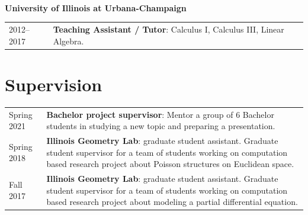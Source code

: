 \documentclass[margin,line,pifont,palatino,courier]{res}
\newenvironment{list1}{
  \begin{list}{\ding{113}}{%
      \setlength{\itemsep}{0in}
      \setlength{\parsep}{0in} \setlength{\parskip}{0in}
      \setlength{\topsep}{0in} \setlength{\partopsep}{0in}
      \setlength{\leftmargin}{0.17in}}}{\end{list}}
\begin{document}
\begin{resume}
\begin{tabular}{@{}p{1.2in}p{0.5in}p{3in}}
\end{tabular}\\
\begin{list1}
\item[] \textbf{University of Illinois at Urbana-Champaign}
\end{list1}
\begin{tabular}{@{}p{1.2in}p{3.5in}}
2012--2017 & \textbf{Teaching Assistant / Tutor}: Calculus I, Calculus III, Linear Algebra.
\end{tabular}
\newpage

\section{\sc Supervision}
\begin{tabular}{@{}p{1.2in}p{3in}}
Spring 2021 &  \textbf{Bachelor project supervisor}: Mentor a group of 6 Bachelor students in studying a new topic and preparing a presentation.\\
Spring 2018 & \textbf{Illinois Geometry Lab}: graduate student assistant. Graduate student supervisor for a team of students working on computation based research project about Poisson structures on Euclidean space.\\
Fall 2017 & \textbf{Illinois Geometry Lab}: graduate student assistant. Graduate student supervisor for a team of students working on computation based research project about modeling a partial differential equation.\\


\end{tabular}
\end{resume}
\end{document}
